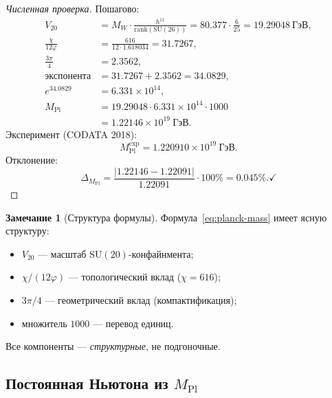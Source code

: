 \documentclass[11pt,a4paper]{article}
\newcommand{\SU}{\mathrm{SU}}
\newcommand{\Mpl}{M_{\text{Pl}}}
\theoremstyle{definition}
\newtheorem{remark}[theorem]{Замечание}
\begin{document}
\begin{proof}[Численная проверка]
Пошагово:
\begin{align}
    V_{20} &= M_W \cdot \frac{h^{11}}{\mathrm{rank}(\SU(26))} 
           = 80.377 \cdot \frac{6}{25} = 19.29048~\text{ГэВ}, \\
    \frac{\chi}{12\varphi} &= \frac{616}{12 \cdot 1.618034} 
                            = 31.7267, \\
    \frac{3\pi}{4} &= 2.3562, \\
    \text{экспонента} &= 31.7267 + 2.3562 = 34.0829, \\
    e^{34.0829} &= 6.331 \times 10^{14}, \\
    \Mpl &= 19.29048 \cdot 6.331 \times 10^{14} \cdot 1000 \\
         &= 1.22146 \times 10^{19}~\text{ГэВ}.
\end{align}
Эксперимент (CODATA 2018):
\begin{equation}
    \Mpl^{\text{exp}} = 1.220910 \times 10^{19}~\text{ГэВ}.
\end{equation}
Отклонение:
\begin{equation}
    \Delta_{\Mpl} = \frac{|1.22146 - 1.22091|}{1.22091} \cdot 100\% 
    = \mathbf{0.045\%}. \checkmark
\end{equation}
\end{proof}

\begin{remark}[Структура формулы]
\label{rem:planck-structure}
Формула~\eqref{eq:planck-mass} имеет ясную структуру:
\begin{itemize}
    \item $V_{20}$ — масштаб $\SU(20)$-конфайнмента;
    \item $\chi/(12\varphi)$ — топологический вклад ($\chi = 616$);
    \item $3\pi/4$ — геометрический вклад (компактификация);
    \item множитель $1000$ — перевод единиц.
\end{itemize}
Все компоненты — \emph{структурные}, не подгоночные.
\end{remark}

\subsection{Постоянная Ньютона из $\Mpl$}
\label{subsec:newton-constant}
\end{document}
